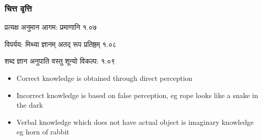 \begin{frame}[fragile]\frametitle{चित्त वृत्ति}

\begin{sanskrit}
प्रत्यक्ष अनुमान आगम: प्रमाणानि १.०७

विपर्यय: मिथ्या ज्ञानम् अतद् रूप प्रतिष्ठम् १.०८

शब्द ज्ञान अनुपाति वस्तु शून्यो विकल्प: १.०९
\end{sanskrit}


	\begin{itemize}
	\item Correct knowledge is obtained through direct perception
	\item Incorrect knowledge is based on false perception, eg rope looks like a snake in the dark
	\item Verbal knowledge which does not have actual object is imaginary knowledge eg horn of rabbit
	\end{itemize}

\end{frame}
